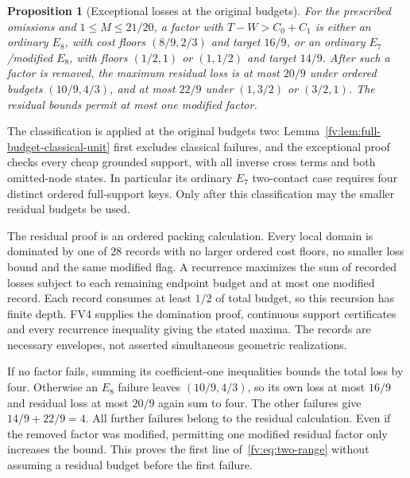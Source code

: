 \documentclass[11pt]{article}
\newtheorem{proposition}[theorem]{Proposition}
\theoremstyle{remark}\newtheorem{remark}[theorem]{Remark}
\numberwithin{equation}{section}
\begin{document}
\begin{proposition}[Exceptional losses at the original budgets]
For the prescribed omissions and $1\le M\le21/20$, a factor with
$T-W>C_0+C_1$ is either an ordinary $E_8$, with cost floors
$(8/9,2/3)$ and target $16/9$, or an ordinary $E_7$/modified
$E_8$, with floors $(1/2,1)$ or $(1,1/2)$ and target $14/9$.
After such a factor is removed, the maximum residual loss is at
most $20/9$ under ordered budgets $(10/9,4/3)$, and at most
$22/9$ under $(1,3/2)$ or $(3/2,1)$. The residual bounds permit
at most one modified factor.
\end{proposition}

The classification is applied at the original budgets two:
Lemma~\ref{fv:lem:full-budget-classical-unit} first excludes
classical failures, and the exceptional proof checks every cheap
grounded support, with all inverse cross terms and both
omitted-node states. In particular its ordinary $E_7$ two-contact
case requires four distinct ordered full-support keys. Only after
this classification may the smaller residual budgets be used.

The residual proof is an ordered packing calculation. Every local
domain is dominated by one of 28 records with no larger ordered
cost floors, no smaller loss bound and the same modified flag.
A recurrence maximizes the sum of recorded losses subject to
each remaining endpoint budget and at most one modified record.
Each record consumes at least $1/2$ of total budget, so this
recursion has finite depth. FV4 supplies the domination proof,
continuous support certificates and every recurrence inequality
giving the stated maxima. The records are necessary envelopes,
not asserted simultaneous geometric realizations.

If no factor fails, summing its coefficient-one inequalities
bounds the total loss by four. Otherwise an $E_8$ failure leaves
$(10/9,4/3)$, so its own loss at most $16/9$ and residual loss at
most $20/9$ again sum to four. The other failures give
$14/9+22/9=4$. All further failures belong to the residual
calculation. Even if the removed factor was modified, permitting
one modified residual factor only increases the bound. This proves
the first line of~\eqref{fv:eq:two-range} without assuming a
residual budget before the first failure.
\end{document}

